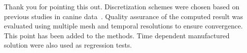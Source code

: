\documentclass[letterpaper,12pt]{report}
\newcommand{\picdir}{pdffig}
\begin{document}
\begin{itemize}
{\color{red}
Thank you for pointing this out. Discretization schemes were chosen based on
previous studies in canine data~\cite{fuentesetal11a}. 
Quality assurance of the computed result was evaluated using multiple mesh
and temporal resolutions to ensure convergence. 
This point has been added to the methods.
Time dependent manufactured solution were also used as regression tests.



}
\end{itemize}
\end{document}

